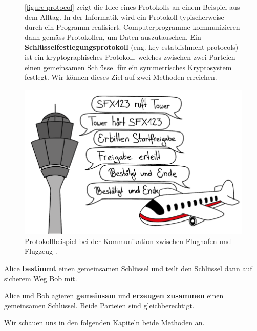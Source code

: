 \begin{figure}[htb]
\centering
\begin{minipage}{0.55\textwidth}
\autoref{figure-protocol} zeigt die Idee eines Protokolls an einem Beispiel aus dem Alltag. In der Informatik wird ein Protokoll typischerweise durch ein Programm realisiert. Computerprogramme kommunizieren dann gemäss Protokollen, um Daten auszutauschen.
Ein \textbf{Schlüsselfestlegungsprotokoll} (eng. key establishment protocols) ist ein kryptographisches Protokoll, welches zwischen zwei Parteien einen gemeinsamen Schlüssel für ein symmetrisches Kryptosystem festlegt. Wir können dieses Ziel auf zwei Methoden erreichen.
\end{minipage}
\hfill
\begin{minipage}{0.4\textwidth}
\centering
\includegraphics[scale=0.15]{protokoll}
\caption{Protokollbeispiel bei der Kommunikation zwischen Flughafen und Flugzeug \cite{hohl2023protokoll}.}
\label{figure-protocol}
\end{minipage}
\end{figure}

\begin{definition}
Alice \textbf{bestimmt} einen gemeinsamen Schlüssel und teilt den Schlüssel dann auf sicherem Weg Bob mit.
\end{definition}

\begin{definition}
Alice und Bob agieren \textbf{gemeinsam} und \textbf{erzeugen zusammen} einen gemeinsamen Schlüssel. Beide Parteien sind gleichberechtigt.
\end{definition}

Wir schauen uns in den folgenden Kapiteln beide Methoden an.
